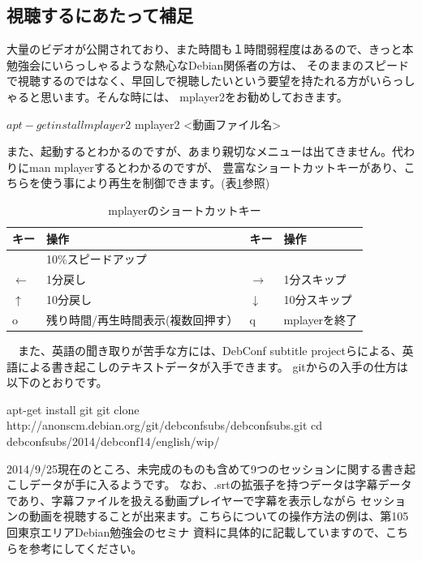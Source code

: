 \documentclass[mingoth,a4paper]{jsarticle}
\begin{document}
\subsection{視聴するにあたって補足}

 大量のビデオが公開されており、また時間も１時間弱程度はあるので、きっと本勉強会にいらっしゃるような熱心なDebian関係者の方は、
そのままのスピードで視聴するのではなく、早回しで視聴したいという要望を持たれる方がいらっしゃると思います。そんな時には、
mplayer2をお勧めしておきます。

\begin{commandline}
$ apt-get install mplayer2
$ mplayer2 <動画ファイル名>
\end{commandline}

 また、起動するとわかるのですが、あまり親切なメニューは出てきません。代わりにman mplayerするとわかるのですが、
豊富なショートカットキーがあり、こちらを使う事により再生を制御できます。(表\ref{tab:mplayer-key}参照)


\begin{table}[htbp!]
\centering
\begin{tabular}{|l|p{7cm}|l|p{7cm}|}
\hline
キー&操作 &キー & 操作\\ \hline \hline
[ & 10\%スロー & ] & 10\%スピードアップ \\ \hline
$\leftarrow$ & 1分戻し & $\rightarrow$ & 1分スキップ \\ \hline
$\uparrow$ & 10分戻し & $\downarrow$ & 10分スキップ \\ \hline
o & 残り時間/再生時間表示(複数回押す） & q & mplayerを終了\\ \hline
\end{tabular}
\caption{mplayerのショートカットキー}
\label{tab:mplayer-key}
\end{table}

　また、英語の聞き取りが苦手な方には、DebConf subtitle projectらによる、英語による書き起こしのテキストデータが入手できます。
gitからの入手の仕方は以下のとおりです。

\begin{commandline}
apt-get install git
git clone http://anonscm.debian.org/git/debconfsubs/debconfsubs.git
cd debconfsubs/2014/debconf14/english/wip/
\end{commandline}

 2014/9/25現在のところ、未完成のものも含めて9つのセッションに関する書き起こしデータが手に入るようです。
なお、.srtの拡張子を持つデータは字幕データであり、字幕ファイルを扱える動画プレイヤーで字幕を表示しながら
セッションの動画を視聴することが出来ます。こちらについての操作方法の例は、第105回東京エリアDebian勉強会のセミナ
資料\cite{ref:osc-tokyo-2013-fall}に具体的に記載していますので、こちらを参考にしてください。
\end{document}
